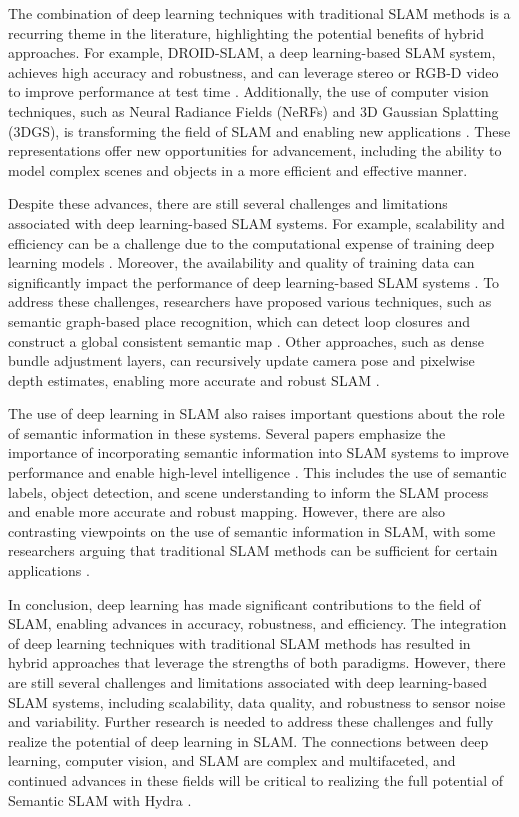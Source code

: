 \documentclass[conference]{IEEEtran}
\begin{document}
The combination of deep learning techniques with traditional SLAM methods is a recurring theme in the literature, highlighting the potential benefits of hybrid approaches. For example, DROID-SLAM, a deep learning-based SLAM system, achieves high accuracy and robustness, and can leverage stereo or RGB-D video to improve performance at test time \cite{b5}. Additionally, the use of computer vision techniques, such as Neural Radiance Fields (NeRFs) and 3D Gaussian Splatting (3DGS), is transforming the field of SLAM and enabling new applications \cite{b4}. These representations offer new opportunities for advancement, including the ability to model complex scenes and objects in a more efficient and effective manner.

Despite these advances, there are still several challenges and limitations associated with deep learning-based SLAM systems. For example, scalability and efficiency can be a challenge due to the computational expense of training deep learning models \cite{b1}. Moreover, the availability and quality of training data can significantly impact the performance of deep learning-based SLAM systems \cite{b2}. To address these challenges, researchers have proposed various techniques, such as semantic graph-based place recognition, which can detect loop closures and construct a global consistent semantic map \cite{b3}. Other approaches, such as dense bundle adjustment layers, can recursively update camera pose and pixelwise depth estimates, enabling more accurate and robust SLAM \cite{b5}.

The use of deep learning in SLAM also raises important questions about the role of semantic information in these systems. Several papers emphasize the importance of incorporating semantic information into SLAM systems to improve performance and enable high-level intelligence \cite{b3}. This includes the use of semantic labels, object detection, and scene understanding to inform the SLAM process and enable more accurate and robust mapping. However, there are also contrasting viewpoints on the use of semantic information in SLAM, with some researchers arguing that traditional SLAM methods can be sufficient for certain applications \cite{b1}.

In conclusion, deep learning has made significant contributions to the field of SLAM, enabling advances in accuracy, robustness, and efficiency. The integration of deep learning techniques with traditional SLAM methods has resulted in hybrid approaches that leverage the strengths of both paradigms. However, there are still several challenges and limitations associated with deep learning-based SLAM systems, including scalability, data quality, and robustness to sensor noise and variability. Further research is needed to address these challenges and fully realize the potential of deep learning in SLAM. The connections between deep learning, computer vision, and SLAM are complex and multifaceted, and continued advances in these fields will be critical to realizing the full potential of Semantic SLAM with Hydra \cite{b4}.
\end{document}
